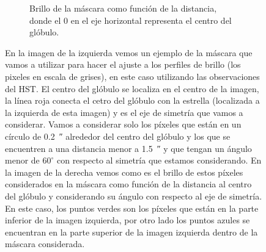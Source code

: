 \documentclass{book}
\begin{document}
\begin{figure}[htb]
\begin{subfigure}[b]{0.5\textwidth}
    \caption{Brillo de la máscara como función de la distancia, donde el 0 en el eje horizontal representa el centro del glóbulo.}
    \label{fig:f2}
  \end{subfigure}
  \caption{En la imagen de la izquierda vemos un ejemplo de la máscara que vamos a utilizar para hacer el ajuste a los perfiles de brillo (los pixeles en escala de grises), en este caso utilizando las observaciones del HST. El centro del glóbulo se localiza en el centro de la imagen, la línea roja conecta el cetro del glóbulo con la estrella (localizada a la izquierda de esta imagen) y es el eje de simetría que vamos a considerar. Vamos a considerar solo los píxeles que están en un círculo de \SI{0.2}{\arcsecond} alrededor del centro del glóbulo y los que se encuentren a una distancia menor a \SI{1.5}{\arcsecond} y que tengan un ángulo menor de $60^\circ$ con respecto al simetría que estamos considerando. En la imagen de la derecha vemos como es el brillo de estos píxeles considerados en la máscara como función de la distancia al centro del glóbulo y considerando su ángulo con respecto al eje de simetría. En este caso, los puntos verdes son los píxeles que están en la parte inferior de la imagen izquierda, por otro lado los puntos azules se encuentran en la parte superior de la imagen izquierda dentro de la máscara considerada.}
  \label{ejemplo mascara}
\end{figure}
\end{document}
